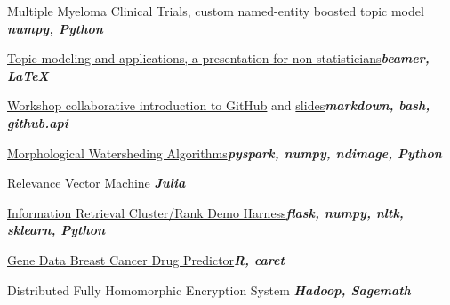 \documentclass{article}
\newenvironment{**mylist}[2]{
  \subsubsection*{#1\hfill\small#2}
  \small
  \begin{list}{}{}
   \setlength{\topsep}{0pt}
   \setlength{\itemsep}{1pt}
   \setlength{\parskip}{0pt}
   \setlength{\parsep}{0pt}}{\end{list}\normalsize}
\newcommand{\LUx}[1]{{\bf\em #1}}
\begin{document}
\pagebreak
{}
\small
\vspace{-.08in}\begin{**mylist}{}{}
\item Multiple Myeloma Clinical Trials, custom named-entity boosted topic model \hfill\LUx{numpy, Python}
\item \href{https://github.com/probinso/expert-modeling-system/blob/master/decks/itds/pres.pdf}{Topic modeling and applications, a presentation for non-statisticians}\hfill\LUx{beamer, \LaTeX}
\item \href{https://github.com/probinso/ABC}{Workshop collaborative introduction to GitHub} and \href{https://github.com/probinso/introduction-git}{slides}\hfill\LUx{markdown, bash, github.api}
\item \href{https://github.com/probinso/morphological-watersheds}{Morphological Watersheding Algorithms}\hfill\LUx{pyspark, numpy, ndimage, Python}
\item \href{https://github.com/probinso/RVM.jl/blob/master/src/RVM.jl}{Relevance Vector Machine} \hfill\LUx{Julia}
\item \href{https://github.com/probinso/IR-cluster-rank-demo}{Information Retrieval Cluster/Rank Demo Harness}\hfill\LUx{flask, numpy, nltk, sklearn, Python}
\item \href{https://github.com/probinso/stats-methods-project}{Gene Data Breast Cancer Drug Predictor}\hfill\LUx{R, caret}
\item Distributed Fully Homomorphic Encryption System \hfill\LUx{Hadoop, Sagemath}

\end{**mylist}
\end{document}
